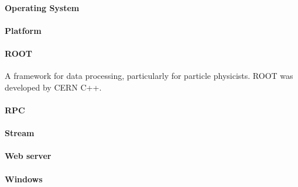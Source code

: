 \paragraph{Operating System}

\paragraph{Platform}

\paragraph{ROOT}
A framework for data processing, particularly for particle physicists. ROOT was developed by CERN C++.


\paragraph{RPC}

\paragraph{Stream}

\paragraph{Web server}

\paragraph{Windows}


























